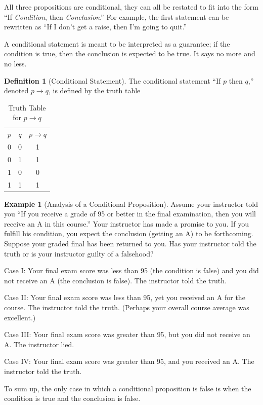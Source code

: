 \documentclass[10pt,]{book}
\theoremstyle{plain}
\theoremstyle{definition}
\newtheorem{definition}[theorem]{Definition}
\theoremstyle{definition}
\theoremstyle{definition}
\newtheorem{example}[theorem]{Example}
\theoremstyle{definition}
\begin{document}
%
\par
All three propositions are conditional, they can all be restated to fit into the form  ``If \emph{Condition}, then \emph{Conclusion}.'' For example, the first statement can be rewritten as ``If I don't get a raise, then I'm going to quit.''%
\par
A conditional statement is meant to be interpreted as a guarantee; if the condition is true, then the conclusion is expected to be true. It says no more and no less.%
\begin{definition}[Conditional Statement]\label{def-conditional}
\label{notation-4}
The conditional statement ``If \(p\) then \(q\),'' denoted \(p \rightarrow  q\), is defined by the truth table%
\leavevmode%
\begin{table}
\centering
\begin{tabular}{ccc}
\(p\) &\( q\) &\( p \rightarrow q \)\tabularnewline[0pt]
 0 & 0 & 1 \tabularnewline[0pt]
 0 & 1 & 1 \tabularnewline[0pt]
 1 & 0 & 0 \tabularnewline[0pt]
 1 & 1 & 1 
\end{tabular}
\caption{Truth Table for \(p \rightarrow q\)\label{tt-conditional}}
\end{table}
\end{definition}
\begin{example}[Analysis of a Conditional Proposition]\label{conditional-analysis}
 Assume your instructor told you ``If you receive a grade of 95 or better in the final examination, then you will receive
an A in this course.'' Your instructor has made a promise to you. If you fulfill his condition, you expect the conclusion
(getting an A) to be forthcoming. Suppose your graded final has been returned to you. Has your instructor told the truth 
or is your instructor guilty of a falsehood?%
\par
Case I: Your final exam score was less than 95 (the condition is false) and you did not receive an A (the conclusion is false). The instructor told the truth.%
\par
Case II: Your final exam score was less than 95, yet you received an A for the course. The instructor told the truth. (Perhaps your overall course average was excellent.) %
\par
Case III: Your final exam score was greater than 95, but you did not receive an A. The instructor lied.%
\par
Case IV: Your final exam score was greater than 95, and you received an A. The instructor told the truth.%
\par
To sum up, the only case in which a conditional proposition is false is when the condition is true and the conclusion is false.%
\end{example}
\end{document}
